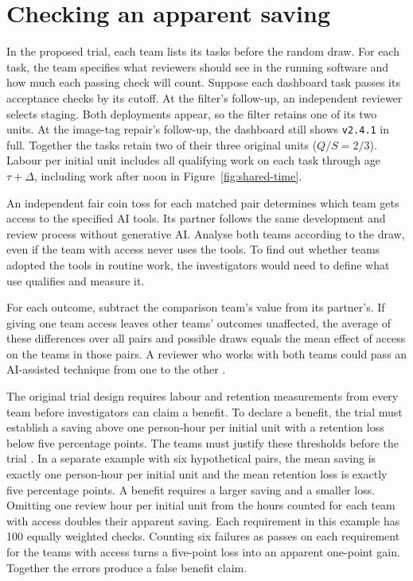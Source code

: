 \section{Checking an apparent saving}
\label{sec:workplace}

In the proposed trial, each team lists its tasks before the random draw. For each task, the team specifies what reviewers should see in the running software and how much each passing check will count. Suppose each dashboard task passes its acceptance checks by its cutoff. At the filter's follow-up, an independent reviewer selects staging. Both deployments appear, so the filter retains one of its two units. At the image-tag repair's follow-up, the dashboard still shows \texttt{v2.4.1} in full. Together the tasks retain two of their three original units ($Q/S=2/3$). Labour per initial unit includes all qualifying work on each task through age $\tau+\Delta$, including work after noon in Figure~\ref{fig:shared-time}.

An independent fair coin toss for each matched pair determines which team gets access to the specified AI tools. Its partner follows the same development and review process without generative AI. Analyse both teams according to the draw, even if the team with access never uses the tools. To find out whether teams adopted the tools in routine work, the investigators would need to define what use qualifies and measure it.

For each outcome, subtract the comparison team's value from its partner's. If giving one team access leaves other teams' outcomes unaffected, the average of these differences over all pairs and possible draws equals the mean effect of access on the teams in those pairs. A reviewer who works with both teams could pass an AI-assisted technique from one to the other \cite{hudgens2008}.

The original trial design requires labour and retention measurements from every team before investigators can claim a benefit. To declare a benefit, the trial must establish a saving above one person-hour per initial unit with a retention loss below five percentage points. The teams must justify these thresholds before the trial \cite{piaggio2012}. In a separate example with six hypothetical pairs, the mean saving is exactly one person-hour per initial unit and the mean retention loss is exactly five percentage points. A benefit requires a larger saving and a smaller loss. Omitting one review hour per initial unit from the hours counted for each team with access doubles their apparent saving. Each requirement in this example has 100 equally weighted checks. Counting six failures as passes on each requirement for the teams with access turns a five-point loss into an apparent one-point gain. Together the errors produce a false benefit claim.

